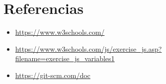 \documentclass{article}
\begin{document}
	\newpage
% 

    \section{Referencias}
    \begin{itemize}	
    	\item \url{https://www.w3schools.com/}
        \item \url{https://www.w3schools.com/js/exercise_js.asp?filename=exercise_js_variables1}
        \item \url{https://git-scm.com/doc}
	\end{itemize}

 
%
%
%
			
\end{document}
